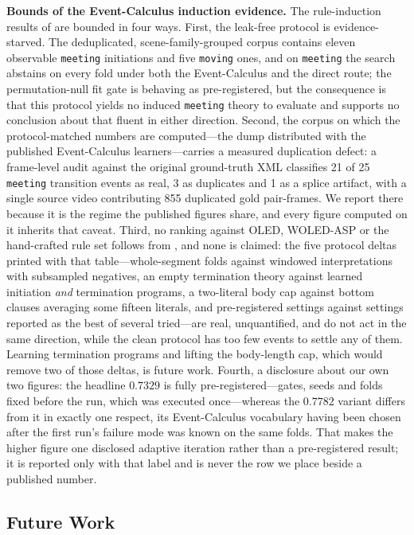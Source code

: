 \textbf{Bounds of the Event-Calculus induction evidence.} The rule-induction results of  are bounded in four ways. First, the leak-free protocol is evidence-starved. The deduplicated, scene-family-grouped corpus contains eleven observable \texttt{meeting} initiations and five \texttt{moving} ones, and on \texttt{meeting} the search abstains on every fold under both the Event-Calculus and the direct route; the permutation-null fit gate is behaving as pre-registered, but the consequence is that this protocol yields no induced \texttt{meeting} theory to evaluate and supports no conclusion about that fluent in either direction. Second, the corpus on which the protocol-matched numbers are computed---the dump distributed with the published Event-Calculus learners---carries a measured duplication defect: a frame-level audit against the original ground-truth XML classifies 21 of 25 \texttt{meeting} transition events as real, 3 as duplicates and 1 as a splice artifact, with a single source video contributing 855 duplicated gold pair-frames. We report there because it is the regime the published figures share, and every figure computed on it inherits that caveat. Third, no ranking against OLED, WOLED-ASP or the hand-crafted rule set follows from , and none is claimed: the five protocol deltas printed with that table---whole-segment folds against windowed interpretations with subsampled negatives, an empty termination theory against learned initiation \emph{and} termination programs, a two-literal body cap against bottom clauses averaging some fifteen literals, and pre-registered settings against settings reported as the best of several tried---are real, unquantified, and do not act in the same direction, while the clean protocol has too few events to settle any of them. Learning termination programs and lifting the body-length cap, which would remove two of those deltas, is future work. Fourth, a disclosure about our own two figures: the headline $0.7329$ is fully pre-registered---gates, seeds and folds fixed before the run, which was executed once---whereas the $0.7782$ variant differs from it in exactly one respect, its Event-Calculus vocabulary having been chosen after the first run's failure mode was known on the same folds. That makes the higher figure one disclosed adaptive iteration rather than a pre-registered result; it is reported only with that label and is never the row we place beside a published number.

\subsection{Future Work}

